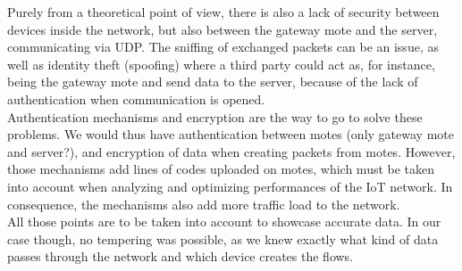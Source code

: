 Purely from a theoretical point of view, there is also a lack of security between devices inside the network, but also between the gateway mote and the server, communicating via UDP. The sniffing of exchanged packets can be an issue, as well as identity theft (spoofing) where a third party could act as, for instance, being the gateway mote and send data to the server, because of the lack of authentication when communication is opened. \\

Authentication mechanisms and encryption are the way to go to solve these problems. We would thus have authentication between motes (only gateway mote and server?), and encryption of data when creating packets from motes. However, those mechanisms add lines of codes uploaded on motes, which must be taken into account when analyzing and optimizing performances of the IoT network. In consequence, the mechanisms also add more traffic load to the network.\\

All those points are to be taken into account to showcase accurate data. In our case though, no tempering was possible, as we knew exactly what kind of data passes through the network and which device creates the flows.

